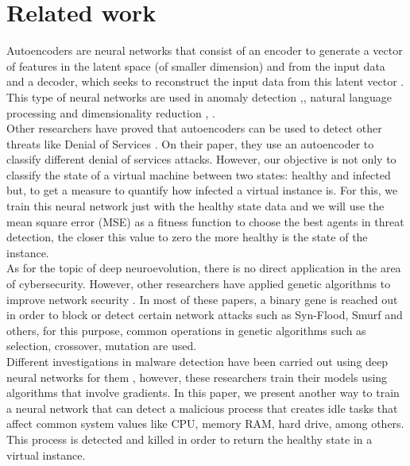 \documentclass{iosart2c}
\begin{document}
\section{Related work}\label{relatedwork}

Autoencoders are neural networks that consist of an encoder to generate a vector of features in the latent space (of smaller dimension) and from the input data and a decoder, which seeks to reconstruct the input data from this latent vector \cite{autoencoders_nlp1}. This type of neural networks are used in anomaly detection \cite{anomaly1, anomaly3},\cite{anomaly4}, natural language processing \cite{autoencoders_nlp1} and dimensionality reduction \cite{dimred1}, \cite{dimred2}.\\

Other researchers have proved that autoencoders can be used to detect other threats like Denial of Services \cite{autoencoderdos}. On their paper, they use an autoencoder to classify different denial of services attacks. However, our objective is not only to classify the state of a virtual machine between two states: healthy and infected but, to get a measure to quantify how infected a virtual instance is. For this, we train this neural network just with the healthy state data and we will use the mean square error (MSE) as a fitness function to choose the best agents in threat detection, the closer this value to zero the more healthy is the state of the instance.\\

As for the topic of deep neuroevolution, there is no direct application in the area of cybersecurity. However, other researchers have applied genetic algorithms to improve network security \cite{GA1, GA2, GA3}. In most of these papers, a binary gene is reached out in order to block or detect certain network attacks such as Syn-Flood, Smurf and others, for this purpose, common operations in genetic algorithms such as selection, crossover, mutation are used.\\

Different investigations in malware detection have been carried out using deep neural networks for them \cite{malwarednn1, malwarednn2,malwarednn3}, however, these researchers train their models using algorithms that involve gradients. In this paper, we present another way to train a neural network that can detect a malicious process that creates idle tasks that affect common system values like CPU, memory RAM, hard drive, among others. This process is detected and killed in order to return the healthy state in a virtual instance.
\end{document}
